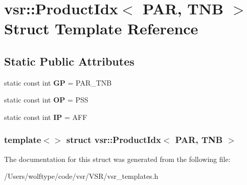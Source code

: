 \hypertarget{structvsr_1_1_product_idx_3_01_p_a_r_00_01_t_n_b_01_4}{\section{vsr\-:\-:Product\-Idx$<$ P\-A\-R, T\-N\-B $>$ Struct Template Reference}
\label{structvsr_1_1_product_idx_3_01_p_a_r_00_01_t_n_b_01_4}
}
\subsection*{Static Public Attributes}
\begin{DoxyCompactItemize}
\item 
\hypertarget{structvsr_1_1_product_idx_3_01_p_a_r_00_01_t_n_b_01_4_a64644565e04571958d9acc2f4145b1ed}{static const int {\bfseries G\-P} = P\-A\-R\-\_\-\-T\-N\-B}\label{structvsr_1_1_product_idx_3_01_p_a_r_00_01_t_n_b_01_4_a64644565e04571958d9acc2f4145b1ed}

\item 
\hypertarget{structvsr_1_1_product_idx_3_01_p_a_r_00_01_t_n_b_01_4_a4f63bf58ea81f0f6f54b4101e6ced93d}{static const int {\bfseries O\-P} = P\-S\-S}\label{structvsr_1_1_product_idx_3_01_p_a_r_00_01_t_n_b_01_4_a4f63bf58ea81f0f6f54b4101e6ced93d}

\item 
\hypertarget{structvsr_1_1_product_idx_3_01_p_a_r_00_01_t_n_b_01_4_ac85252758141e128c08b0930bcbde5c5}{static const int {\bfseries I\-P} = A\-F\-F}\label{structvsr_1_1_product_idx_3_01_p_a_r_00_01_t_n_b_01_4_ac85252758141e128c08b0930bcbde5c5}

\end{DoxyCompactItemize}
\subsubsection*{template$<$$>$ struct vsr\-::\-Product\-Idx$<$ P\-A\-R, T\-N\-B $>$}



The documentation for this struct was generated from the following file\-:\begin{DoxyCompactItemize}
\item 
/\-Users/wolftype/code/vsr/\-V\-S\-R/vsr\-\_\-templates.\-h\end{DoxyCompactItemize}
